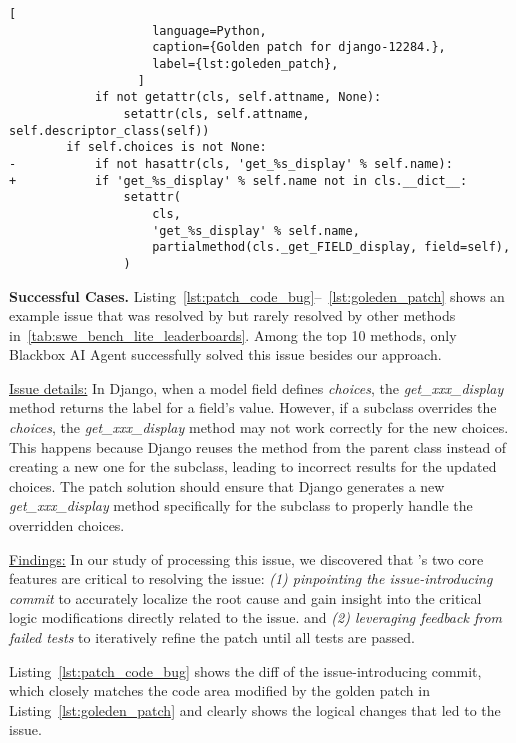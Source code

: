 \begin{lstlisting}[
                    language=Python, 
                    caption={Golden patch for django-12284.}, 
                    label={lst:goleden_patch},
                  ]
            if not getattr(cls, self.attname, None):
                setattr(cls, self.attname, self.descriptor_class(self))
        if self.choices is not None: 
-           if not hasattr(cls, 'get_%s_display' % self.name):
+           if 'get_%s_display' % self.name not in cls.__dict__:
                setattr(
                    cls,
                    'get_%s_display' % self.name,
                    partialmethod(cls._get_FIELD_display, field=self),
                )
\end{lstlisting}

\noindent\textbf{Successful Cases.}
Listing~\ref{lst:patch_code_bug}--~\ref{lst:goleden_patch} shows an example issue that was resolved by \sys but rarely resolved by other methods in~\cref{tab:swe_bench_lite_leaderboards}. 
Among the top 10 methods, only Blackbox AI Agent successfully solved this issue besides our approach.

\underline{Issue details:} In Django, when a model field defines \textit{choices}, the \textit{get\_xxx\_display} method returns the label for a field's value. 
However, if a subclass overrides the \textit{choices}, the \textit{get\_xxx\_display} method may not work correctly for the new choices. 
This happens because Django reuses the method from the parent class instead of creating a new one for the subclass, leading to incorrect results for the updated choices. 
The patch solution should ensure that Django generates a new \textit{get\_xxx\_display} method specifically for the subclass to properly handle the overridden choices.

\underline{Findings:} In our study of processing this issue, we discovered that \sys’s two core features are critical to resolving the issue: 
\textit{(1) pinpointing the issue-introducing commit} to accurately localize the root cause and gain insight into the critical logic modifications directly related to the issue.
and \textit{(2) leveraging feedback from failed tests} to iteratively refine the patch until all tests are passed.

Listing~\ref{lst:patch_code_bug} shows the diff of the issue-introducing commit, which closely matches the code area modified by the golden patch in Listing~\ref{lst:goleden_patch} and clearly shows the logical changes that led to the issue.

